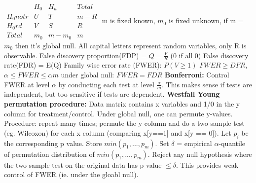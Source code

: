 $\begin{matrix}
& H_0 & H_a & Total \\
H_0 not r & U & T & m-R\\
H_0rd & V & S & R \\
Total & m_0 & m-m_0 & m
\end{matrix}$
m is fixed known, $m_0$ is fixed unknown, if m = $m_0$ then it's global null. All capital letters represent random variables, only R is observable. 
False discovery proportion(FDP) = $Q = \frac{V}{R}$ (0 if all 0)
False discovery rate(FDR) = E(Q) 
Family wise error rate (FWER): $P(V \geq 1)$
$FWER \geq DFR$, $\alpha \leq FWER \leq \alpha m$ under global null: $FWER = FDR$
\textbf{Bonferroni: } Control FWER at level $\alpha$ by conducting each test at level $\frac{\alpha}{m}$. This makes sense if tests are independent, but too sensitive if tests are dependent. 
\textbf{Westfall Young permutation procedure: } Data matrix contains x variables and 1/0 in the y column for treatment/control. Under global null, one can permute y-values. Procedure: repeat many times; permute the y column and do a two sample test (eg. Wilcoxon) for each x column (comparing x[y==1] and x[y == 0]). Let $p_i$ be the corresponding p value. Store $min(p_1,...,p_m)$. Set $\delta$ = empirical $\alpha$-quantile of permutation distribution of $min(p_1,...,p_m)$. Reject any null hypothesis where the two-sample test on the original data has p-value $\leq \delta$. This provides weak control of FWER (ie. under the gloabl null). 